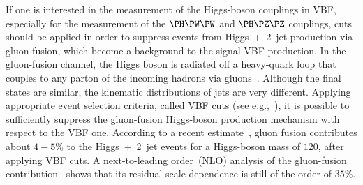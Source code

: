If one is interested in the measurement of the Higgs-boson couplings in VBF,
especially for the measurement of the $\PH\PW\PW$ and $\PH\PZ\PZ$ couplings, 
cuts should
be applied in order to suppress events from Higgs~+~2~jet production via
gluon fusion, which become a background to the signal VBF production.  In the
gluon-fusion channel, the Higgs boson is radiated off a heavy-quark loop that
couples to any parton of the incoming hadrons via
gluons~\cite{DelDuca:2001fn,Campbell:2006xx}. Although the final states are
similar, the kinematic distributions of jets are very different.  Applying
appropriate event selection criteria, called VBF cuts (see
e.g.,\ ), it is possible to sufficiently suppress
the gluon-fusion Higgs-boson production mechanism with respect to the VBF
one.  According to a recent estimate~\cite{Nikitenko:2007it}, gluon fusion
contributes about $4{-}5\%$ to the Higgs~+~2~jet events for a Higgs-boson
mass of $120$\UGeV, after applying VBF cuts.
A next-to-leading order~(NLO)
analysis of the gluon-fusion contribution~\cite{Campbell:2006xx} shows that its residual
scale dependence is still of the order of $35\%$.

